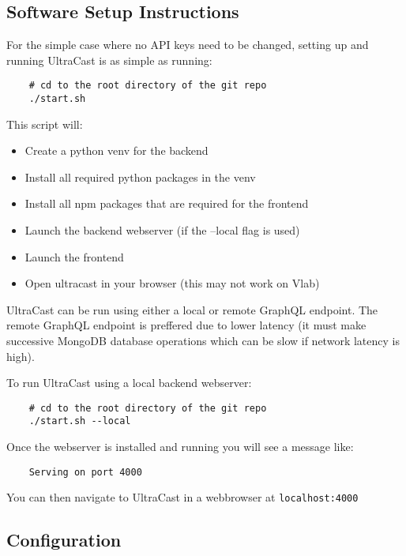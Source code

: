 \documentclass[../report.tex]{subfiles}
\begin{document}
   

\subsection{Software Setup Instructions}

For the simple case where no API keys need to be changed, setting up and running UltraCast is as simple as running:

\begin{verbatim}
    # cd to the root directory of the git repo
    ./start.sh
\end{verbatim}
%
This script will: 
\begin{itemize}
    \item Create a python venv for the backend
    \item Install all required python packages in the venv
    \item Install all npm packages that are required for the frontend
    \item Launch the backend webserver (if the --local flag is used)
    \item Launch the frontend
    \item Open ultracast in your browser (this may not work on Vlab)
\end{itemize}

UltraCast can be run using either a local or remote GraphQL endpoint.
The remote GraphQL endpoint is preffered due to lower latency (it must make successive MongoDB database operations which can be slow if network latency is high).

To run UltraCast using a local backend webserver:

\begin{verbatim}
    # cd to the root directory of the git repo
    ./start.sh --local
\end{verbatim}

Once the webserver is installed and running you will see a message like:

\begin{verbatim}
    Serving on port 4000
\end{verbatim}

You can then navigate to UltraCast in a webbrowser at \verb|localhost:4000|

\subsection{Configuration}
\end{document}
